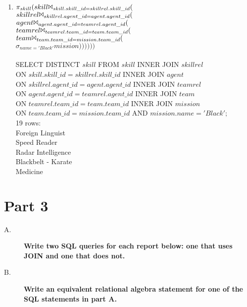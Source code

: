 \documentclass{article}
\begin{document}
\begin{enumerate}
\item
\textsf{$\pi_{skill}(skill \Bowtie_{skill.skill\_id=skillrel.skill\_id} ($\\
$skillrel \Bowtie_{skillrel.agent\_id=agent.agent\_id} ($\\
$agent \Bowtie_{agent.agent\_id=teamrel.agent\_id} ($\\
$teamrel \Bowtie_{teamrel.team\_id=team.team\_id} ($\\
$team \Bowtie_{team.team\_id=mission.team\_id} ($\\
$\sigma_{name='Black'}mission))))))$\\}
\\
SELECT DISTINCT $skill$ FROM $skill$ INNER JOIN $skillrel$\\
ON $skill.skill\_id=skillrel.skill\_id$ INNER JOIN $agent$\\
ON $skillrel.agent\_id=agent.agent\_id$ INNER JOIN $teamrel$\\ 
ON $agent.agent\_id=teamrel.agent\_id$ INNER JOIN $team$\\ 
ON $teamrel.team\_id=team.team\_id$ INNER JOIN $mission$\\ 
ON $team.team\_id=mission.team\_id$ AND $mission.name='Black';$\\
19 rows:\\
Foreign Linguist\\
Speed Reader\\
Radar Intelligence\\
Blackbelt - Karate\\
Medicine\\

\end{enumerate}

\section*{Part 3}
\begin{description}
\item[A.]
\textbf{Write two SQL queries for each report below: one that uses JOIN and one that does not.\\}

\item[B.]
\textbf{Write an equivalent relational algebra statement for one of the SQL statements in part A.\\}
\end{description}
\end{document}
